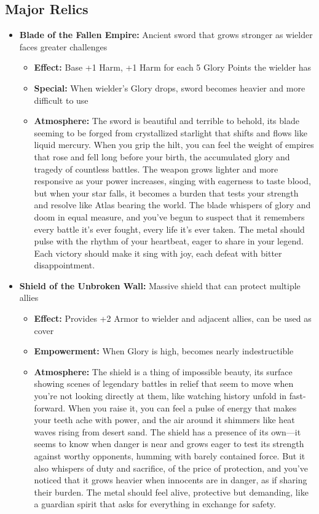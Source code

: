 \documentclass[11pt]{article}
\begin{document}
\subsection{Major Relics}
\begin{itemize}
\item \textbf{Blade of the Fallen Empire:} Ancient sword that grows stronger as wielder faces greater challenges
  \begin{itemize}
  \item \textbf{Effect:} Base +1 Harm, +1 Harm for each 5 Glory Points the wielder has
  \item \textbf{Special:} When wielder's Glory drops, sword becomes heavier and more difficult to use
  \item \textbf{Atmosphere:} The sword is beautiful and terrible to behold, its blade seeming to be forged from crystallized starlight that shifts and flows like liquid mercury. When you grip the hilt, you can feel the weight of empires that rose and fell long before your birth, the accumulated glory and tragedy of countless battles. The weapon grows lighter and more responsive as your power increases, singing with eagerness to taste blood, but when your star falls, it becomes a burden that tests your strength and resolve like Atlas bearing the world. The blade whispers of glory and doom in equal measure, and you've begun to suspect that it remembers every battle it's ever fought, every life it's ever taken. The metal should pulse with the rhythm of your heartbeat, eager to share in your legend. Each victory should make it sing with joy, each defeat with bitter disappointment.
  \end{itemize}
\item \textbf{Shield of the Unbroken Wall:} Massive shield that can protect multiple allies
  \begin{itemize}
  \item \textbf{Effect:} Provides +2 Armor to wielder and adjacent allies, can be used as cover
  \item \textbf{Empowerment:} When Glory is high, becomes nearly indestructible
  \item \textbf{Atmosphere:} The shield is a thing of impossible beauty, its surface showing scenes of legendary battles in relief that seem to move when you're not looking directly at them, like watching history unfold in fast-forward. When you raise it, you can feel a pulse of energy that makes your teeth ache with power, and the air around it shimmers like heat waves rising from desert sand. The shield has a presence of its own—it seems to know when danger is near and grows eager to test its strength against worthy opponents, humming with barely contained force. But it also whispers of duty and sacrifice, of the price of protection, and you've noticed that it grows heavier when innocents are in danger, as if sharing their burden. The metal should feel alive, protective but demanding, like a guardian spirit that asks for everything in exchange for safety.
  \end{itemize}
\end{itemize}
\end{document}
